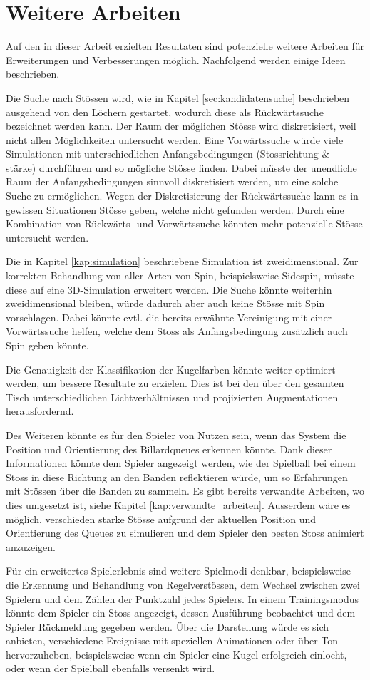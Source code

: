 \chapter{Weitere Arbeiten}\label{kap:weitere_arbeiten}
Auf den in dieser Arbeit erzielten Resultaten sind potenzielle weitere Arbeiten für Erweiterungen und Verbesserungen
möglich.
Nachfolgend werden einige Ideen beschrieben.

Die Suche nach Stössen wird, wie in Kapitel \ref{sec:kandidatensuche} beschrieben ausgehend von den Löchern gestartet,
wodurch diese als Rückwärtssuche bezeichnet werden kann.
Der Raum der möglichen Stösse wird diskretisiert, weil nicht allen Möglichkeiten untersucht werden.
Eine Vorwärtssuche würde viele Simulationen mit unterschiedlichen Anfangsbedingungen (Stossrichtung \& -stärke)
durchführen und so mögliche Stösse finden.
Dabei müsste der unendliche Raum der Anfangsbedingungen sinnvoll diskretisiert werden, um eine solche Suche zu ermöglichen.
Wegen der Diskretisierung der Rückwärtssuche kann es in gewissen Situationen Stösse geben, welche nicht gefunden werden.
Durch eine Kombination von Rückwärts- und Vorwärtssuche könnten mehr potenzielle Stösse untersucht werden.

Die in Kapitel \ref{kap:simulation} beschriebene Simulation ist zweidimensional.
Zur korrekten Behandlung von aller Arten von Spin, beispielsweise Sidespin, müsste diese auf eine 3D-Simulation erweitert werden.
Die Suche könnte weiterhin zweidimensional bleiben, würde dadurch aber auch keine Stösse mit Spin vorschlagen.
Dabei könnte evtl. die bereits erwähnte Vereinigung mit einer Vorwärtssuche helfen, welche dem Stoss als
Anfangsbedingung zusätzlich auch Spin geben könnte.

Die Genauigkeit der Klassifikation der Kugelfarben könnte weiter optimiert werden, um bessere Resultate zu erzielen.
Dies ist bei den über den gesamten Tisch unterschiedlichen Lichtverhältnissen und projizierten Augmentationen herausfordernd.

Des Weiteren könnte es für den Spieler von Nutzen sein, wenn das System die Position und Orientierung des Billardqueues
erkennen könnte.
Dank dieser Informationen könnte dem Spieler angezeigt werden, wie der Spielball bei einem Stoss in diese Richtung
an den Banden reflektieren würde, um so Erfahrungen mit Stössen über die Banden zu sammeln.
Es gibt bereits verwandte Arbeiten, wo dies umgesetzt ist, siehe Kapitel \ref{kap:verwandte_arbeiten}.
Ausserdem wäre es möglich, verschieden starke Stösse aufgrund der aktuellen Position und Orientierung des Queues zu simulieren
und dem Spieler den besten Stoss animiert anzuzeigen.

Für ein erweitertes Spielerlebnis sind weitere Spielmodi denkbar, beispielsweise die Erkennung und Behandlung von
Regelverstössen, dem Wechsel zwischen zwei Spielern und dem Zählen der Punktzahl jedes Spielers.
In einem Trainingsmodus könnte dem Spieler ein Stoss angezeigt, dessen Ausführung beobachtet und dem Spieler
Rückmeldung gegeben werden.
Über die Darstellung würde es sich anbieten, verschiedene Ereignisse mit speziellen Animationen oder über Ton hervorzuheben,
beispielsweise wenn ein Spieler eine Kugel erfolgreich einlocht, oder wenn der Spielball ebenfalls versenkt wird.

